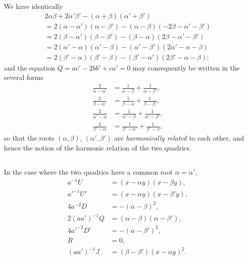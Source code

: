 \documentclass[12pt,a4paper]{article}
\begin{document}
We have identically
\begin{align*}
2\alpha\beta + 2\alpha'\beta' - (\alpha + \beta)(\alpha' + \beta') \\
= 2(\alpha - \alpha')(\alpha - \beta') - (\alpha - \beta)(-2\beta - \alpha' - \beta') \\
= 2(\beta - \alpha')(\beta - \beta') - (\beta - \alpha)(2\beta - \alpha' - \beta') \\
= 2(\alpha' - \alpha)(\alpha' - \beta) - (\alpha' - \beta')(2\alpha' - \alpha - \beta) \\
= 2(\beta' - \alpha)(\beta' - \beta) - (\beta' - \alpha')(2\beta' - \alpha - \beta);
\end{align*}
and the equation $Q = ac' - 2bb' + ca' = 0$ may consequently be written in the several forms
\begin{align*}
\frac{2}{\alpha - \alpha'} &= \frac{1}{\alpha - \beta} + \frac{1}{\alpha - \beta'},\\
\frac{2}{\beta - \alpha'} &= \frac{1}{\beta - \alpha} + \frac{1}{\beta - \beta'},\\
\frac{2}{\alpha' - \alpha} &= \frac{1}{\alpha' - \beta} + \frac{1}{\alpha' - \beta'},\\
\frac{2}{\beta' - \alpha} &= \frac{1}{\beta' - \alpha'} + \frac{1}{\beta' - \beta},
\end{align*}
so that the roots $(\alpha, \beta)$, $(\alpha', \beta')$ are \textit{harmonically related} to each other, and hence the notion of the harmonic relation of the two quadrics.

\subsection{}

In the case where the two quadrics have a common root $\alpha = \alpha'$,
\begin{align*}
a^{-1}U &= (x - \alpha y)(x - \beta y),\\
a'^{-1}U' &= (x - \alpha y)(x - \beta' y),\\
4a^{-2}D &= -(\alpha - \beta)^2,\\
2(aa')^{-1}Q &= (\alpha - \beta)(\alpha - \beta'),\\
4a'^{-2}D' &= -(\alpha - \beta')^2,\\
R &= 0,\\
(aa')^{-1}J &= (\beta - \beta')(x - \alpha y)^2.
\end{align*}

\subsection{}
\end{document}
